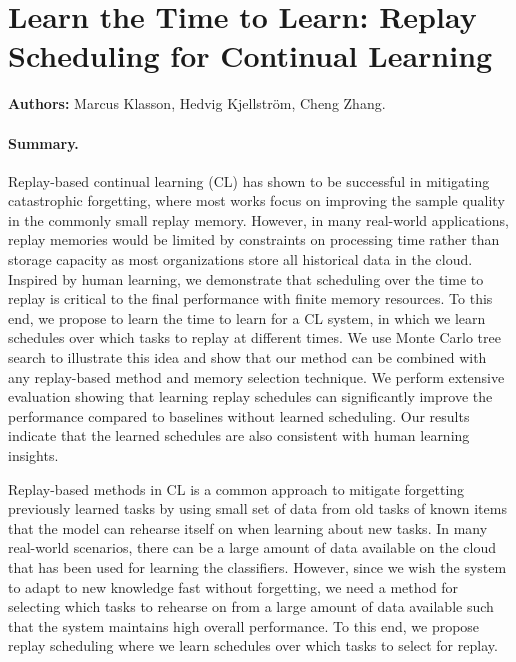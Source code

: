 
\section{Learn the Time to Learn: Replay Scheduling for Continual Learning}
\label{sec:paperC}

\textbf{Authors:} Marcus Klasson, Hedvig Kjellström, Cheng Zhang. 

\paragraph{Summary.}
Replay-based continual learning (CL) has shown to be successful in mitigating catastrophic forgetting, where most works focus on improving the sample quality in the commonly small replay memory. However, in many real-world applications, replay memories would be limited by constraints on processing time rather than storage capacity as most organizations store all historical data in the cloud. Inspired by human learning, we demonstrate that scheduling over the time to replay is critical to the final performance with finite memory resources. To this end, we propose to learn the time to learn for a CL system, in which we learn schedules over which tasks to replay at different times. We use Monte Carlo tree search to illustrate this idea and show that our method can be combined with any replay-based method and memory selection technique. We perform extensive evaluation showing that learning replay schedules can significantly improve the performance compared to baselines without learned scheduling. Our results indicate that the learned schedules are also consistent with human learning insights.




Replay-based methods in CL is a common approach to mitigate forgetting previously learned tasks by using small set of data from old tasks of known items that the model can rehearse itself on when learning about new tasks. In many real-world scenarios, there can be a large amount of data available on the cloud that has been used for learning the classifiers. However, since we wish the system to adapt to new knowledge fast without forgetting, we need a method for selecting which tasks to rehearse on from a large amount of data available such that the system maintains high overall performance. To this end, we propose replay scheduling where we learn schedules over which tasks to select for replay. 


